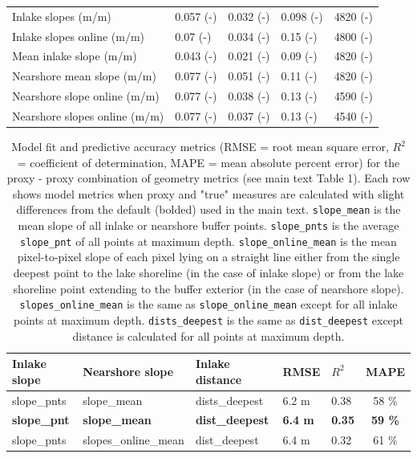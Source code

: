 \documentclass[draft,wrr]{agutexSI2019}
\begin{document}
\begin{table}
\begin{tabular}{lllll}
Inlake slopes (m/m) & 0.057 (-) & 0.032 (-) & 0.098 (-) & 4820 (-)\\
Inlake slopes online (m/m) & 0.07 (-) & 0.034 (-) & 0.15 (-) & 4800 (-)\\
Mean inlake slope (m/m) & 0.043 (-) & 0.021 (-) & 0.09 (-) & 4820 (-)\\
Nearshore mean slope (m/m) & 0.077 (-) & 0.051 (-) & 0.11 (-) & 4820 (-)\\
Nearshore slope online (m/m) & 0.077 (-) & 0.038 (-) & 0.13 (-) & 4590 (-)\\
Nearshore slopes online (m/m) & 0.077 (-) & 0.037 (-) & 0.13 (-) & 4540 (-)\\
\hline
\end{tabular}
\end{table}

\begin{table}
\caption{Model fit and predictive accuracy metrics (RMSE = root mean square error, $R^2$ = coefficient of determination, MAPE = mean absolute percent error) for the proxy - proxy combination of geometry metrics (see main text Table 1). Each row shows model metrics when proxy and "true" measures are calculated with slight differences from the default (bolded) used in the main text. \texttt{slope\_mean} is the mean slope of all inlake or nearshore buffer points. \texttt{slope\_pnts} is the average \texttt{slope\_pnt} of all points at maximum depth. \texttt{slope\_online\_mean} is the mean pixel-to-pixel slope of each pixel lying on a straight line either from the single deepest point to the lake shoreline (in the case of inlake slope) or from the lake shoreline point extending to the buffer exterior (in the case of nearshore slope). \texttt{slopes\_online\_mean} is the same as \texttt{slope\_online\_mean} except for all inlake points at maximum depth. \texttt{dists\_deepest} is the same as \texttt{dist\_deepest} except distance is calculated for all points at maximum depth.}  \label{tableS2}
\centering
\setlength\tabcolsep{1.5pt} %
\begin{tabular}{lllllc}
\hline
Inlake slope & Nearshore slope & Inlake distance & RMSE & $R^2$ & MAPE\\
\hline
slope\_pnts & slope\_mean & dists\_deepest & 6.2 m & 0.38 & 58 \%\\
\textbf{slope\_pnt} & \textbf{slope\_mean} & \textbf{dist\_deepest} & \textbf{6.4 m} & \textbf{0.35} & \textbf{59 \%}\\
slope\_pnts & slopes\_online\_mean & dist\_deepest & 6.4 m & 0.32 & 61 \%\\

\end{tabular}
\end{table}
\end{document}
